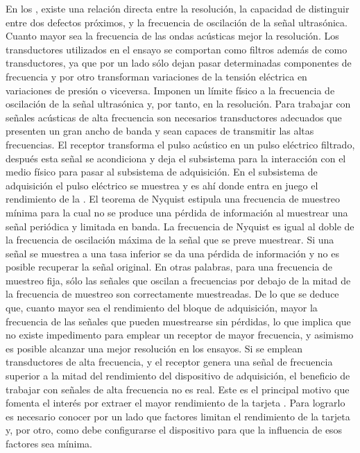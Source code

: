 En los , existe una relación directa entre la resolución, la
capacidad de distinguir entre dos defectos próximos, y la frecuencia de
oscilación de la señal ultrasónica. Cuanto mayor sea la frecuencia de las
ondas acústicas mejor la resolución. Los transductores utilizados en el
ensayo se comportan como filtros además de como transductores, ya que por
un lado sólo dejan pasar determinadas componentes de frecuencia y por otro
transforman variaciones de la tensión eléctrica en variaciones de presión o
viceversa. Imponen un límite físico a la frecuencia de oscilación de la
señal ultrasónica y, por tanto, en la resolución. Para trabajar con señales
acústicas de alta frecuencia son necesarios transductores adecuados que
presenten un gran ancho de banda y sean capaces de transmitir las altas
frecuencias. El receptor transforma el pulso acústico en un pulso eléctrico
filtrado, después esta señal se acondiciona y deja el subsistema para la
interacción con el medio físico para pasar al subsistema de adquisición. En
el subsistema de adquisición el pulso eléctrico se muestrea y es ahí donde
entra en juego el rendimiento de la \kpci{}. El teorema de Nyquist estipula
una frecuencia de muestreo mínima para la cual no se produce una pérdida de
información al muestrear una señal periódica y limitada en banda. La
frecuencia de Nyquist es igual al doble de la frecuencia de oscilación
máxima de la señal que se preve muestrear. Si una señal se muestrea a una
tasa inferior se da una pérdida de información y no es posible recuperar la
señal original. En otras palabras, para una frecuencia de muestreo fija,
sólo las señales que oscilan a frecuencias por debajo de la mitad de la
frecuencia de muestreo son correctamente muestreadas. De lo que se deduce
que, cuanto mayor sea el rendimiento del bloque de adquisición, mayor la
frecuencia de las señales que pueden muestrearse sin pérdidas, lo que
implica que no existe impedimento para emplear un receptor de mayor
frecuencia, y asimismo es posible alcanzar una mejor resolución en los
ensayos. Si se emplean transductores de alta frecuencia, y el receptor
genera una señal de frecuencia superior a la mitad del rendimiento del
dispositivo de adquisición, el beneficio de trabajar con señales de alta
frecuencia no es real. Este es el principal motivo que fomenta el interés
por extraer el mayor rendimiento de la tarjeta \kpci{}. Para lograrlo es
necesario conocer por un lado que factores limitan el rendimiento de la
tarjeta y, por otro, como debe configurarse el dispositivo para que la
influencia de esos factores sea mínima.


